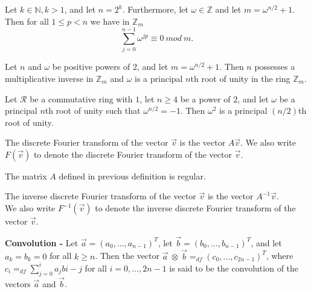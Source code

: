 \documentclass[a4paper]{article}
\begin{document}
\begin{lemma}
Let $k \in \mathbb{N}, k > 1$, and let $n = 2^{k}$. Furthermore, let $\omega \in \mathbb{Z}$ and let $m = \omega^{n/2} + 1$. Then for all $1 \leq p < n$ we have in $\mathbb{Z}_{m}$
$$\sum_{j=0}^{n-1}\omega^{jp} \equiv 0\ mod\ m.$$
\end{lemma}


\begin{theorem}
Let $n$ and $\omega$ be positive powers of $2$, and let $m = \omega^{n/2} + 1$. Then $n$ possesses a multiplicative inverse in $\mathbb{Z}_{m}$ and $\omega$ is a principal $n$th root of unity in the ring $\mathbb{Z}_{m}$.
\end{theorem}


\begin{theorem}
Let $\mathcal{R}$ be a commutative ring with $1$, let $n \geq 4$ be a power of $2$, and let $\omega$ be a principal $n$th root of unity such that $\omega^{n/2} = -1$. Then $\omega^{2}$ is a principal $(n/2)$th root of unity.
\end{theorem}


\begin{definition}
The discrete Fourier transform of the vector $\vec{v}$ is the vector $A\vec{v}$. We also write $F(\vec{v})$ to denote the discrete Fourier transform of the vector $\vec{v}$.
\end{definition}


\begin{theorem}
The matrix $A$ defined in previous definition is regular.
\end{theorem}


\begin{definition}
The inverse discrete Fourier transform of the vector $\vec{v}$ is the vector $A^{-1}\vec{v}$. \\
We also write $F^{-1}(\vec{v})$ to denote the inverse discrete Fourier transform of the vector $\vec{v}$.
\end{definition}


\begin{definition}
\textbf{Convolution -} Let $\vec{a} = (a_{0}, \ldots, a_{n-1})^{T}$, let $\vec{b} = (b_{0}, \ldots, b_{n-1})^{T}$, and let $a_{k} = b_{k} = 0$ for all $k \geq n$. Then the vector $\vec{a}\ \otimes\ \vec{b} =_{df} (c_{0}, \ldots, c_{2n - 1})^{T}$, where $c_{i} =_{df} \sum_{j=0}^{i}a_{j}b{i-j}$ for all $i = 0, \ldots, 2n -1$ is said to be the convolution of the vectors $\vec{a}$ and $\vec{b}$.
\end{definition}
\end{document}
